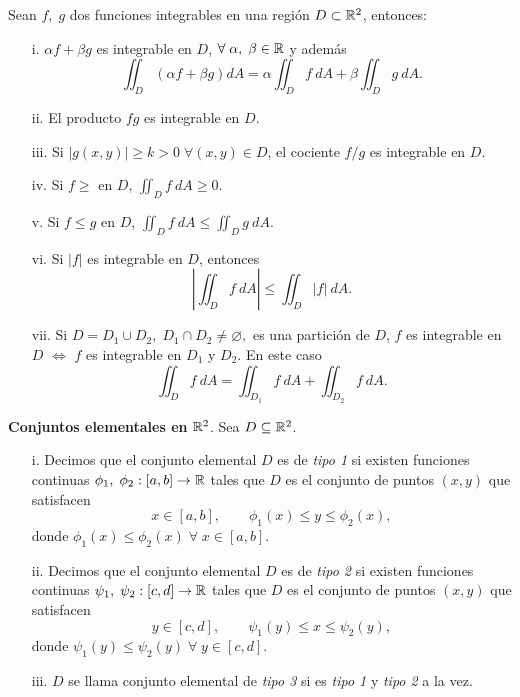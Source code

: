 \begin{propertie}
    Sean $f,\;g$ dos funciones integrables en una regi\'on $D\subset\mathbb{R}^2$, entonces:
    \begin{enumerate}
        \item[i.] $\alpha f+\beta g$ es integrable en $D$, $\forall\;\alpha,\;\beta\in\mathbb{R}$ y adem\'as
        \[
            \iint_D \left(\alpha f+\beta g\right)dA=\alpha\iint_D f\:dA+\beta\iint_D g\:dA.
        \]
        \item[ii.] El producto $fg$ es integrable en $D$.
        \item[iii.] Si $|g(x,y)|\geq k>0\;\forall(x,y)\in D$, el cociente $f/g$ es integrable en $D$.
        \item[iv.] Si $f\geq$ en $D$, $\iint_D f\:dA\geq0$.
        \item[v.]Si $f\leq g$ en $D$, $\iint_D f\:dA\leq\iint_D g\:dA.$
        \item[vi.]Si $|f|$ es integrable en $D$, entonces 
        \[
            \left|\iint_D f\:dA\right|\leq\iint_D|f|\:dA.  
        \]    
        \item[vii.] Si $D=D_1\cup D_2,\;D_1\cap D_2\neq\varnothing,$ es una partici\'on de $D$, $f$ es integrable en $D$ $\iff$ $f$ es integrable en $D_1$ y $D_2$. En este caso 
        \[
            \iint_D f\:dA=\iint_{D_1} f\:dA+\iint_{D_2}f\:dA.    
        \]
    \end{enumerate}
\end{propertie}

\begin{definition}\textbf{Conjuntos elementales en }$\mathbb{R}^2$.
    Sea $D\subseteq\mathbb{R}^2$.
    \begin{enumerate}
    \item[i.]
    Decimos que el conjunto elemental $D$ es de \textit{tipo 1} si existen funciones continuas $\phi_1,\;\phi_2:[a,b]\to\mathbb{R}$ tales que $D$ es el conjunto de puntos $(x,y)$ que satisfacen
    \[
        x\in[a,b], \qquad \phi_1(x)\leq y\leq\phi_2(x),  
    \]%
    donde $\phi_1(x)\leq\phi_2(x)\;\forall\;x\in[a,b].$
    \item[ii.]
    Decimos que el conjunto elemental $D$ es de \textit{tipo 2} si existen funciones continuas $\psi_1,\;\psi_2:[c,d]\to\mathbb{R}$ tales que $D$ es el conjunto de puntos $(x,y)$ que satisfacen
    \[
        y\in[c,d], \qquad \psi_1(y)\leq x\leq\psi_2(y),  
    \]
    donde $\psi_1(y)\leq\psi_2(y)\;\forall\;y\in[c,d].$
    \item[iii.]
    $D$ se llama conjunto elemental de \textit{tipo 3} si es \textit{tipo 1} y \textit{tipo 2} a la vez.
    \end{enumerate}
\end{definition}


